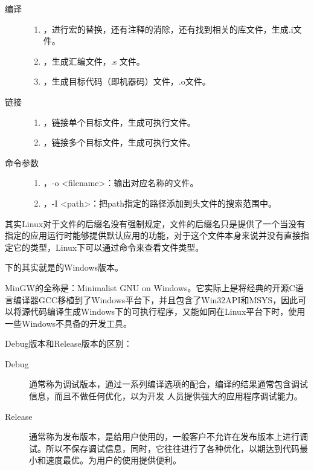 \begin{description}
\item[编译]
\item[]
\begin{enumerate}
\item {}，进行宏的替换，还有注释的消除，还有找到相关的库文件，生成.i文件。
\item {}，生成汇编文件，.s 文件。
\item {}，生成目标代码（即机器码）文件，.o文件。
\end{enumerate}
\item[链接]
\item[]
\begin{enumerate}
\item {}，链接单个目标文件，生成可执行文件。
\item {}，链接多个目标文件，生成可执行文件。
\end{enumerate}
\item[命令参数]
\item[]
\begin{enumerate}
\item {}，-o <filename>：输出对应名称的文件。
\item {}，-I <path>：把path指定的路径添加到头文件的搜索范围中。
\end{enumerate}
\end{description}

其实Linux对于文件的后缀名没有强制规定，文件的后缀名只是提供了一个当没有指定的应用运行时能够提供默认应用的功能，对于这个文件本身来说并没有直接指定它的类型，Linux下可以通过命令来查看文件类型。\dpar

下的\href{http://www.mingw.org/}{}其实就是的Windows版本。

MinGW的全称是：Minimalist GNU on Windows。它实际上是将经典的开源C语言编译器GCC移植到了Windows平台下，并且包含了Win32API和MSYS，因此可以将源代码编译生成Windows下的可执行程序，又能如同在Linux平台下时，使用一些Windows不具备的开发工具。\dpar

Debug版本和Release版本的区别：

\begin{description}
\item[Debug] 通常称为调试版本，通过一系列编译选项的配合，编译的结果通常包含调试信息，而且不做任何优化，以为开发 人员提供强大的应用程序调试能力。
\item[Release] 通常称为发布版本，是给用户使用的，一般客户不允许在发布版本上进行调试。所以不保存调试信息，同时，它往往进行了各种优化，以期达到代码最小和速度最优。为用户的使用提供便利。
\end{description}
